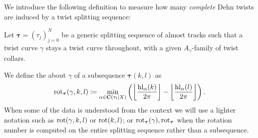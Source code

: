 We introduce the following definition to measure how many \emph{complete} Dehn twists are induced by a twist splitting sequence:

\begin{defin}\label{def:rot}
Let $\bm\tau=(\tau_j)_{j=0}^N$ be a generic splitting sequence of almost tracks such that a twist curve $\gamma$ stays a twist curve throughout, with a given $A_\gamma$-family of twist collars.

We define the  about $\gamma$ of a subsequence $\bm\tau(k,l)$ as
$$
\mathrm{rot}_{\bm\tau}(\gamma,k,l)\coloneqq \min_{\alpha\in\mathbf C(\tau_l|X)}\left(\left\lfloor\frac{\mathrm{hl}_\alpha(k)}{2\pi}\right\rfloor-\left\lfloor\frac{\mathrm{hl}_\alpha(l)}{2\pi}\right\rfloor\right).
$$
When some of the data is understood from the context we will use a lighter notation such as $\mathrm{rot}(\gamma,k,l)$ or $\mathrm{rot}(k,l)$; or $\mathrm{rot}_{\bm\tau}(\gamma),\mathrm{rot}_{\bm\tau}$ when the rotation number is computed on the entire splitting sequence rather than a subsequence.
\end{defin}

